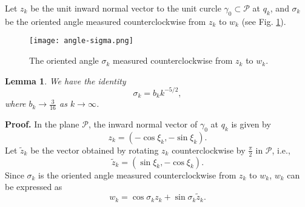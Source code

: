 \documentclass[12pt]{article}
\newtheorem{lemma}{Lemma}
\begin{document}
Let $z_k$ be the unit inward normal vector to the unit curcle $\gamma_0\subset \mathcal{P}$ at $q_k$, 
and $\sigma_k$ be the oriented angle measured counterclockwise from $ z_k $ to $ w_k $
(see Fig. \ref{fig:angle-sigma}). 
\begin{figure}[htbp]
  \begin{center}
  \texttt{[image: angle-sigma.png]}
  \end{center}
  \caption{The oriented angle $\sigma_k$ measured counterclockwise from $ z_k $ to $ w_k $.}
  \label{fig:angle-sigma}
\end{figure}
\begin{lemma}\label{lem:angle_convergence}
We have the identity
  $$
  \sigma_k = b_k k^{-5/2},
  $$
  where $b_k \to \frac{3}{16}$ as $k \to \infty$.
\end{lemma}
\textbf{Proof.}
In the plane $\mathcal{P}$, the inward normal vector of $\gamma_0$ at $q_k$ is given by
$$
z_k = (-\cos \xi_k, -\sin \xi_k).
$$
Let $\tilde{z}_k$ be the vector obtained by rotating $z_k$ counterclockwise by $\frac{\pi}{2}$ in $\mathcal{P}$, i.e.,
$$
\tilde{z}_k = (\sin \xi_k,-\cos \xi_k).
$$
Since $\sigma_k$ is the oriented angle measured counterclockwise from $z_k$ to $w_k$, 
$w_k$ can be expressed as
\begin{equation}\label{eq:wk_decomp}
w_k = \cos\sigma_k z_k + \sin\sigma_k \tilde{z}_k.
\end{equation}
\end{document}
